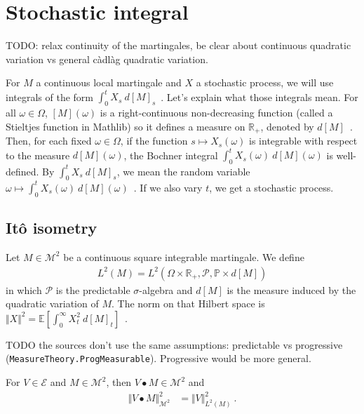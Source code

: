 \section{Stochastic integral}

TODO: relax continuity of the martingales, be clear about continuous quadratic variation vs general càdlàg quadratic variation.

For $M$ a continuous local martingale and $X$ a stochastic process, we will use integrals of the form $\int_0^t X_s \: d[M]_s$~.
Let's explain what those integrals mean. For all $\omega \in \Omega$, $[M](\omega)$ is a right-continuous non-decreasing function (called a Stieltjes function in Mathlib) so it defines a measure on $\mathbb{R}_+$, denoted by $d[M]$~.
Then, for each fixed $\omega \in \Omega$, if the function $s \mapsto X_s(\omega)$ is integrable with respect to the measure $d[M](\omega)$, the Bochner integral $\int_0^t X_s(\omega) \: d[M](\omega)$ is well-defined.
By $\int_0^t X_s \: d[M]_s$, we mean the random variable $\omega \mapsto \int_0^t X_s(\omega) \: d[M](\omega)$~.
If we also vary $t$, we get a stochastic process.


\subsection{Itô isometry}

\begin{definition}\label{def:L2M}
Let $M \in \mathcal{M}^2$ be a continuous square integrable martingale. We define
\begin{align*}
  L^2(M) = L^2(\Omega \times \mathbb{R}_+, \mathcal{P}, \mathbb{P} \times d[M])
\end{align*}
in which $\mathcal{P}$ is the predictable $\sigma$-algebra and $d[M]$ is the measure induced by the quadratic variation of $M$.
The norm on that Hilbert space is $\Vert X \Vert^2 = \mathbb{E}\left[ \int_0^{\infty} X_t^2 \: d[M]_t \right]$~.
\end{definition}

TODO the sources don't use the same assumptions: predictable vs progressive (\texttt{MeasureTheory.ProgMeasurable}). Progressive would be more general.

\begin{lemma}\label{lem:sq_norm_elemStochIntegral}
For $V \in \mathcal{E}$ and $M \in \mathcal{M}^2$, then $V \bullet M \in \mathcal{M}^2$ and
\begin{align*}
  \Vert V \bullet M \Vert_{\mathcal{M}^2}^2
  &= \Vert V \Vert_{L^2(M)}^2
  \: .
\end{align*}
\end{lemma}

